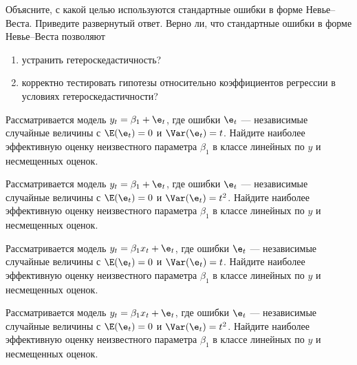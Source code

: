 \documentclass[pdftex,11pt,openany]{book}\usepackage[]{graphicx}\usepackage[]{color}
\begin{document}
\begin{solution}
\end{solution}


\begin{problem}
Объясните, с какой целью используются стандартные ошибки в форме Невье–Веста. Приведите развернутый ответ. Верно ли, что стандартные ошибки в форме Невье–Веста позволяют
\begin{enumerate}
\item устранить гетероскедастичность?
\item корректно тестировать гипотезы относительно коэффициентов регрессии в условиях гетероскедастичности?
\end{enumerate}
\end{problem}

\begin{solution}
\end{solution}


\begin{problem}
Рассматривается модель $y_t=\beta_1+\e_t$, где ошибки $\e_t$  --- независимые
случайные величины с $\E(\e_t)=0$ и $\Var(\e_t)=t$. Найдите наиболее эффективную
оценку неизвестного параметра $\beta_1$ в классе линейных по $y$ и несмещенных оценок.
\end{problem}
\begin{solution}
\end{solution}

\begin{problem}
Рассматривается модель $y_t=\beta_1+\e_t$, где ошибки $\e_t$  --- независимые
случайные величины с $\E(\e_t)=0$ и $\Var(\e_t)=t^2$. Найдите наиболее эффективную
оценку неизвестного параметра $\beta_1$ в классе линейных по $y$ и несмещенных оценок.
\end{problem}
\begin{solution}
\end{solution}


\begin{problem}
Рассматривается модель $y_t=\beta_1 x_t+\e_t$, где ошибки $\e_t$  --- независимые
случайные величины с $\E(\e_t)=0$ и $\Var(\e_t)=t$. Найдите наиболее эффективную
оценку неизвестного параметра $\beta_1$ в классе линейных по $y$ и несмещенных оценок.
\end{problem}
\begin{solution}
\end{solution}


\begin{problem}
Рассматривается модель $y_t=\beta_1 x_t +\e_t$, где ошибки $\e_t$  --- независимые
случайные величины с $\E(\e_t)=0$ и $\Var(\e_t)=t^2$. Найдите наиболее эффективную
оценку неизвестного параметра $\beta_1$ в классе линейных по $y$ и несмещенных оценок.
\end{problem}
\begin{solution}
\end{solution}
\end{document}
